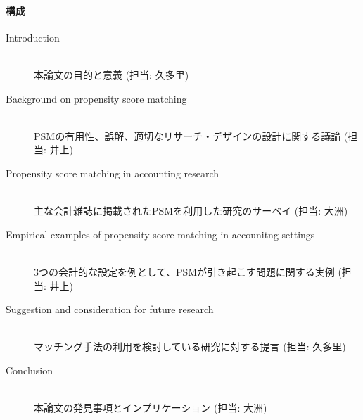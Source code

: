 \begin{itemize}
\paragraph{構成}
\begin{description}
 \item[Introduction] \mbox{}\\
            本論文の目的と意義 (担当: 久多里)
 \item[Background on propensity score matching] \mbox{}\\
            PSMの有用性、誤解、適切なリサーチ・デザインの設計に関する議論 (担当: 井上)
 \item[Propensity score matching in accounting research] \mbox{}\\
            主な会計雑誌に掲載されたPSMを利用した研究のサーベイ (担当: 大洲)
 \item[Empirical examples of propensity score matching in accounitng settings] \mbox{}\\
            3つの会計的な設定を例として、PSMが引き起こす問題に関する実例 (担当: 井上)
 \item[Suggestion and consideration for future research] \mbox{}\\
            マッチング手法の利用を検討している研究に対する提言  (担当: 久多里)
 \item[Conclusion] \mbox{}\\
            本論文の発見事項とインプリケーション  (担当: 大洲)
\end{description}





\end{itemize}
